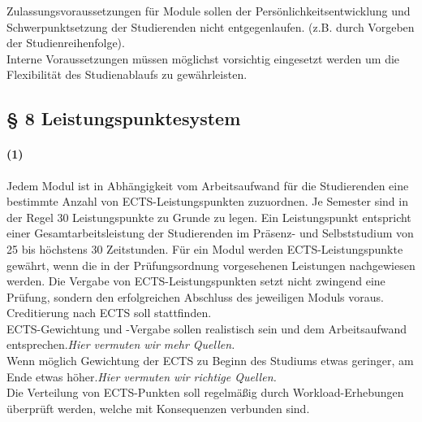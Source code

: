 \documentclass[a4paper]{scrartcl}
\begin{document}
\textcolor{Bernd}{\textbf{\cite{PROT: WiSe2015-RL}} Zulassungsvoraussetzungen für Module sollen der Persönlichkeitsentwicklung und Schwerpunktsetzung der Studierenden nicht entgegenlaufen. (z.B. durch Vorgeben der Studienreihenfolge).}\\


\textcolor{Bernd}{\textbf{\cite{PROT: WiSe2015-RL}} Interne Voraussetzungen müssen  möglichst vorsichtig eingesetzt werden um die Flexibilität des Studienablaufs zu gewährleisten.}

\subsection{§ 8 Leistungspunktesystem}
\paragraph{(1)} Jedem Modul ist in Abhängigkeit vom Arbeitsaufwand für die Studierenden eine bestimmte Anzahl von ECTS-Leistungspunkten
zuzuordnen. Je Semester sind in der Regel 30 Leistungspunkte zu Grunde zu legen. Ein Leistungspunkt entspricht einer Gesamtarbeitsleistung der Studierenden im Präsenz- und Selbststudium von 25 bis höchstens 30 Zeitstunden. Für ein Modul werden ECTS-Leistungspunkte gewährt, wenn die in der Prüfungsordnung vorgesehenen Leistungen nachgewiesen werden. Die Vergabe von ECTS-Leistungspunkten setzt nicht zwingend eine Prüfung, sondern den erfolgreichen Abschluss des jeweiligen Moduls voraus.\\

\textcolor{Bernd}{\textbf{\cite{RESO: SoSe2002-RL}} Creditierung nach ECTS soll stattfinden.}\\

\textcolor{Bernd}{\textbf{\cite{RESO: SoSe2002-RL,PROT: WiSe2015-RL}} ECTS-Gewichtung und -Vergabe sollen realistisch sein und dem Arbeitsaufwand entsprechen.}\textcolor{Brutus}{\emph{Hier vermuten wir mehr Quellen.}}\\

\textcolor{Bernd}{Wenn möglich Gewichtung der ECTS zu Beginn des Studiums etwas geringer, am Ende etwas höher.}\textcolor{Brutus}{\emph{Hier vermuten wir richtige Quellen.}}\\

\textcolor{Bernd}{\textbf{\cite{RESO: WiSe2008-RL}} Die Verteilung von ECTS-Punkten soll regelmäßig durch Workload-Erhebungen überprüft werden, welche mit Konsequenzen verbunden sind.}\\
\end{document}
